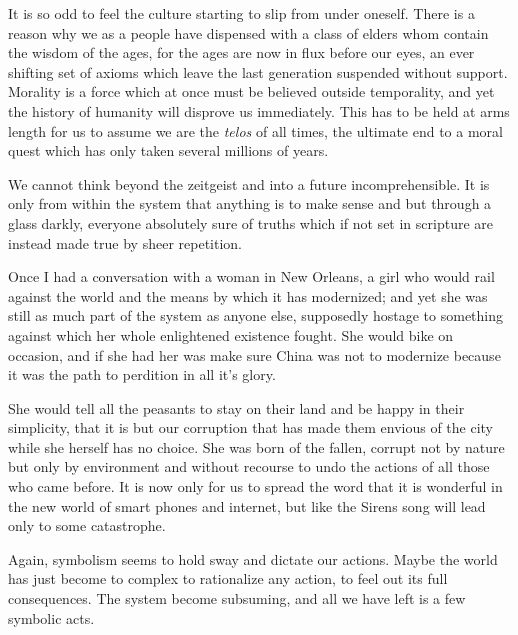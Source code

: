 \documentclass[ebook, 10pt, openright, onecolumn]{memoir}
\begin{document}
It is so odd to feel the culture starting to slip from under oneself.  There is
a reason why we as a people have dispensed with a class of elders whom contain
the wisdom of the ages, for the ages are now in flux before our eyes, an ever
shifting set of axioms which leave the last generation suspended without
support.  Morality is a force which at once must be believed outside
temporality, and yet the history of humanity will disprove us immediately.  This
has to be held at arms length for us to assume we are the \textit{telos} of all
times, the ultimate end to a moral quest which has only taken several millions
of years.

We cannot think beyond the zeitgeist and into a future incomprehensible.  It is
only from within the system that anything is to make sense and but through a
glass darkly, everyone absolutely sure of truths which if not set in scripture
are instead made true by sheer repetition.  

Once I had a conversation with a woman in New Orleans, a girl who would rail
against the world and the means by which it has modernized; and yet she was
still as much part of the system as anyone else, supposedly hostage to something
against which her whole enlightened existence fought.  She would bike on
occasion, and if she had her was make sure China was not to modernize because it
was the path to perdition in all it's glory.

She would tell all the peasants to stay on their land and be happy in their
simplicity, that it is but our corruption that has made them envious of the city
while she herself has no choice.  She was born of the fallen, corrupt not by
nature but only by environment and without recourse to undo the actions of all
those who came before.  It is now only for us to spread the word that it is
wonderful in the new world of smart phones and internet, but like the Sirens
song will lead only to some catastrophe.


Again, symbolism seems to hold sway and dictate our actions.  Maybe the world
has just become to complex to rationalize any action, to feel out its full
consequences.  The system become subsuming, and all we have left is a few
symbolic acts.
\end{document}
